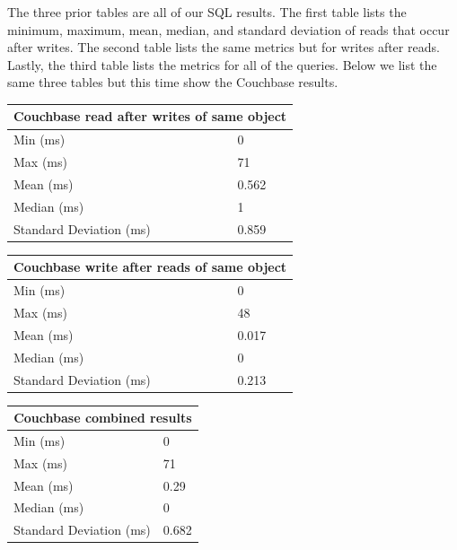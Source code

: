 \documentclass[]{IEEEtran}
\begin{document}
The three prior tables are all of our SQL results. The first table lists the minimum, maximum, mean, median, and standard deviation of reads 
that occur after writes. The second table lists the same metrics but for writes after reads. Lastly, the third table lists the metrics for
all of the queries. Below we list the same three tables but this time show the Couchbase results.

\begin{center}
\begin{tabular}{|l|l|}
	\hline
  	\multicolumn{2}{|c|}{{\bf Couchbase read after writes of same object}} \\
 	\hline
  	 Min (ms) & 0 \\
  	\hline
         Max (ms) & 71 \\
  	\hline
  	Mean (ms) & 0.562 \\
 	\hline
  	Median (ms) & 1 \\
  	\hline
         Standard Deviation (ms) & 0.859 \\
  	\hline
\end{tabular}
\end{center}

\begin{center}
\begin{tabular}{|l|l|}
	\hline
  	\multicolumn{2}{|c|}{{\bf Couchbase write after reads of same object}} \\
 	\hline
  	 Min (ms) & 0 \\
  	\hline
         Max (ms) & 48 \\
  	\hline
  	Mean (ms) & 0.017 \\
 	\hline
  	Median (ms) & 0 \\
  	\hline
         Standard Deviation (ms) & 0.213 \\
  	\hline
\end{tabular}
\end{center}

\begin{center}
\begin{tabular}{|l|l|}
	\hline
  	\multicolumn{2}{|c|}{{\bf Couchbase combined results}} \\
 	\hline
  	 Min (ms) & 0 \\
  	\hline
         Max (ms) & 71 \\
  	\hline
  	Mean (ms) & 0.29 \\
 	\hline
  	Median (ms) & 0 \\
  	\hline
         Standard Deviation (ms) & 0.682 \\
  	\hline
\end{tabular}
\end{center}
\end{document}
